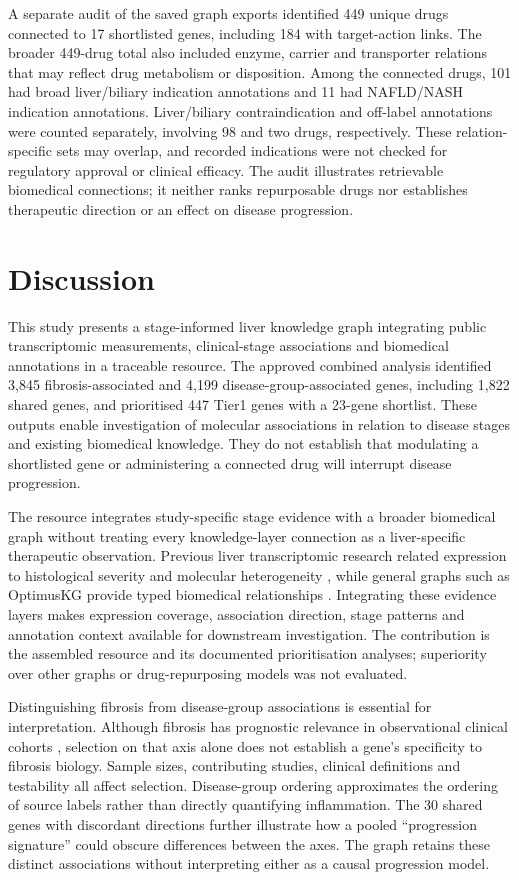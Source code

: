 \documentclass[11pt,a4paper]{article}
\begin{document}
A separate audit of the saved graph exports identified 449 unique drugs connected to 17 shortlisted genes, including 184 with target-action links. The broader 449-drug total also included enzyme, carrier and transporter relations that may reflect drug metabolism or disposition. Among the connected drugs, 101 had broad liver/biliary indication annotations and 11 had NAFLD/NASH indication annotations. Liver/biliary contraindication and off-label annotations were counted separately, involving 98 and two drugs, respectively. These relation-specific sets may overlap, and recorded indications were not checked for regulatory approval or clinical efficacy. The audit illustrates retrievable biomedical connections; it neither ranks repurposable drugs nor establishes therapeutic direction or an effect on disease progression.

\section*{Discussion}
This study presents a stage-informed liver knowledge graph integrating public transcriptomic measurements, clinical-stage associations and biomedical annotations in a traceable resource. The approved combined analysis identified 3,845 fibrosis-associated and 4,199 disease-group-associated genes, including 1,822 shared genes, and prioritised 447 Tier1 genes with a 23-gene shortlist. These outputs enable investigation of molecular associations in relation to disease stages and existing biomedical knowledge. They do not establish that modulating a shortlisted gene or administering a connected drug will interrupt disease progression.

The resource integrates study-specific stage evidence with a broader biomedical graph without treating every knowledge-layer connection as a liver-specific therapeutic observation. Previous liver transcriptomic research related expression to histological severity and molecular heterogeneity \cite{ref4}, while general graphs such as OptimusKG provide typed biomedical relationships \cite{ref5}. Integrating these evidence layers makes expression coverage, association direction, stage patterns and annotation context available for downstream investigation. The contribution is the assembled resource and its documented prioritisation analyses; superiority over other graphs or drug-repurposing models was not evaluated.

Distinguishing fibrosis from disease-group associations is essential for interpretation. Although fibrosis has prognostic relevance in observational clinical cohorts \cite{ref1,ref2}, selection on that axis alone does not establish a gene's specificity to fibrosis biology. Sample sizes, contributing studies, clinical definitions and testability all affect selection. Disease-group ordering approximates the ordering of source labels rather than directly quantifying inflammation. The 30 shared genes with discordant directions further illustrate how a pooled “progression signature” could obscure differences between the axes. The graph retains these distinct associations without interpreting either as a causal progression model.
\end{document}
